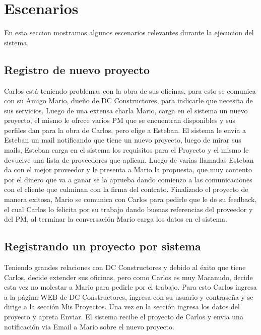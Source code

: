 \section{Escenarios}

En esta seccion mostramos algunos escenarios relevantes durante la ejecucion del sistema.

\subsection{Registro de nuevo proyecto} 
Carlos está teniendo problemas con la obra de sus oficinas, para esto se comunica con su Amigo Mario, dueño de DC Constructores, para indicarle que necesita de sus servicios.
Luego de una extensa charla Mario, carga en el sistema un nuevo proyecto, el mismo le ofrece varios PM que se encuentran disponibles y sus perfiles dan para la obra de Carlos, pero elige a Esteban.
El sistema le envía a Esteban un mail notificando que tiene un nuevo proyecto, luego de mirar sus mails, Esteban carga en el sistema los requisitos para el Proyecto y el mismo le devuelve una lista de proveedores que aplican.
Luego de varias llamadas Esteban da con el mejor proveedor y le presenta a Mario la propuesta, que muy contento por el dinero que va a ganar se la aprueba dando comienzo a las comunicaciones con el cliente que culminan con la firma del contrato.
Finalizado el proyecto de manera exitosa, Mario se comunica con Carlos para pedirle que le de su feedback, el cual Carlos lo felicita por su trabajo dando buenas referencias del proveedor y del PM, al terminar la conversación Mario carga los datos en el sistema.


\subsection{Registrando un proyecto por sistema} 
Teniendo grandes relaciones con DC Constructores y debido al éxito que tiene Carlos, decide extender sus oficinas, pero como Carlos es muy Macanudo, decide esta vez no molestar a Mario para pedirle por el trabajo.
Para esto Carlos ingresa a la página WEB de DC Constructores, ingresa con su usuario y contraseña y se dirige a la sección Mis Proyectos. Una vez en la sección ingresa los datos del proyecto y apreta Enviar.
El sistema recibe el proyecto de Carlos y envia una notificación via Email a Mario sobre el nuevo proyecto.


